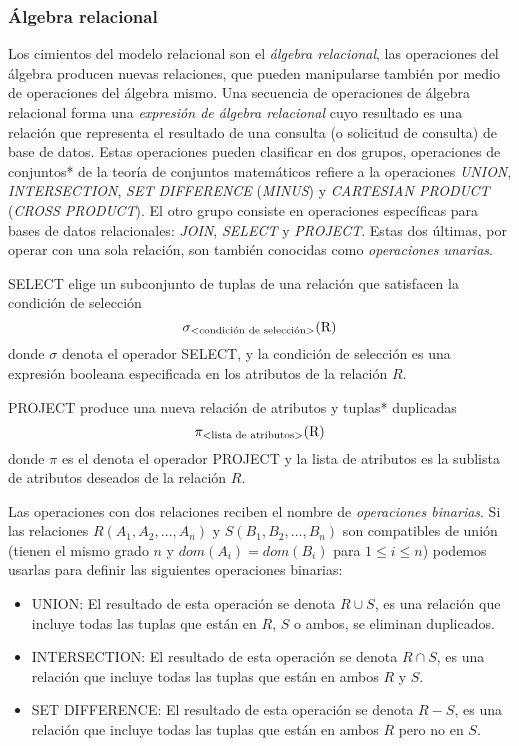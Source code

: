 \subsubsection {Álgebra relacional}\label{subsch:algebra}
Los cimientos del modelo relacional son el \emph{álgebra relacional}, las operaciones del álgebra producen nuevas relaciones, que pueden manipularse también por medio de operaciones del álgebra mismo. Una secuencia de operaciones de álgebra relacional forma una \emph{expresión de álgebra relacional} cuyo resultado es una relación que representa el resultado de una consulta (o solicitud de consulta) de base de datos.\cite{elma11} Estas operaciones pueden clasificar en dos grupos, operaciones de conjuntos* de la teoría de conjuntos matemáticos refiere a la operaciones \emph{UNION}, \emph{INTERSECTION}, \emph{SET DIFFERENCE} (\emph{MINUS}) y \emph{CARTESIAN PRODUCT} (\emph{CROSS PRODUCT}). El otro grupo consiste en operaciones específicas para bases de datos relacionales: \emph{JOIN}, \emph{SELECT} y \emph{PROJECT}. Estas dos últimas, por operar con una sola relación, son también conocidas como \emph{operaciones unarias}.

SELECT elige un subconjunto de tuplas de una relación que satisfacen la condición de selección
\begin{equation}
\sigma_\text{\textless condición de selección\textgreater}{\text{(R)}}
\end{equation}
donde $\sigma$ denota el operador SELECT, y la condición de selección es una expresión booleana especificada en los atributos de la relación $R$.

PROJECT produce una nueva relación de atributos y tuplas* duplicadas
\begin{equation}
\pi_\text{\textless lista de atributos\textgreater}{\text{(R)}}
\end{equation}
donde $\pi$ es el denota el operador PROJECT y la lista de atributos es la sublista de atributos deseados de la relación $R$.

Las operaciones con dos relaciones reciben el nombre de \emph{operaciones binarias}. Si las relaciones $R(A_1,A_2,\ldots,A_n)$ y $S(B_1,B_2,\ldots,B_n)$ son compatibles de unión (tienen el mismo grado $n$ y $dom(A_i)=dom(B_i)$ para $1\leq i\leq n$) podemos usarlas para definir las siguientes operaciones binarias:
\begin{itemize}
	\item UNION: El resultado de esta operación se denota $R \cup S$, es una relación que incluye todas las tuplas que están en $R$, $S$ o ambos, se eliminan duplicados.
	\item INTERSECTION: El resultado de esta operación se denota $R \cap S$, es una relación que incluye todas las tuplas que están en ambos $R$ y $S$.
	\item SET DIFFERENCE: El resultado de esta operación se denota $R - S$, es una relación que incluye todas las tuplas que están en ambos $R$ pero no en $S$.
\end{itemize}

